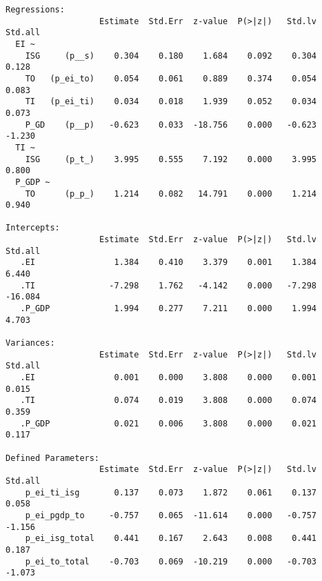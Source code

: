 \begin{verbatim}
Regressions:
                   Estimate  Std.Err  z-value  P(>|z|)   Std.lv  Std.all
  EI ~                                                                  
    ISG     (p__s)    0.304    0.180    1.684    0.092    0.304    0.128
    TO   (p_ei_to)    0.054    0.061    0.889    0.374    0.054    0.083
    TI   (p_ei_ti)    0.034    0.018    1.939    0.052    0.034    0.073
    P_GD    (p__p)   -0.623    0.033  -18.756    0.000   -0.623   -1.230
  TI ~                                                                  
    ISG     (p_t_)    3.995    0.555    7.192    0.000    3.995    0.800
  P_GDP ~                                                               
    TO      (p_p_)    1.214    0.082   14.791    0.000    1.214    0.940

Intercepts:
                   Estimate  Std.Err  z-value  P(>|z|)   Std.lv  Std.all
   .EI                1.384    0.410    3.379    0.001    1.384    6.440
   .TI               -7.298    1.762   -4.142    0.000   -7.298  -16.084
   .P_GDP             1.994    0.277    7.211    0.000    1.994    4.703

Variances:
                   Estimate  Std.Err  z-value  P(>|z|)   Std.lv  Std.all
   .EI                0.001    0.000    3.808    0.000    0.001    0.015
   .TI                0.074    0.019    3.808    0.000    0.074    0.359
   .P_GDP             0.021    0.006    3.808    0.000    0.021    0.117

Defined Parameters:
                   Estimate  Std.Err  z-value  P(>|z|)   Std.lv  Std.all
    p_ei_ti_isg       0.137    0.073    1.872    0.061    0.137    0.058
    p_ei_pgdp_to     -0.757    0.065  -11.614    0.000   -0.757   -1.156
    p_ei_isg_total    0.441    0.167    2.643    0.008    0.441    0.187
    p_ei_to_total    -0.703    0.069  -10.219    0.000   -0.703   -1.073

\end{verbatim}
